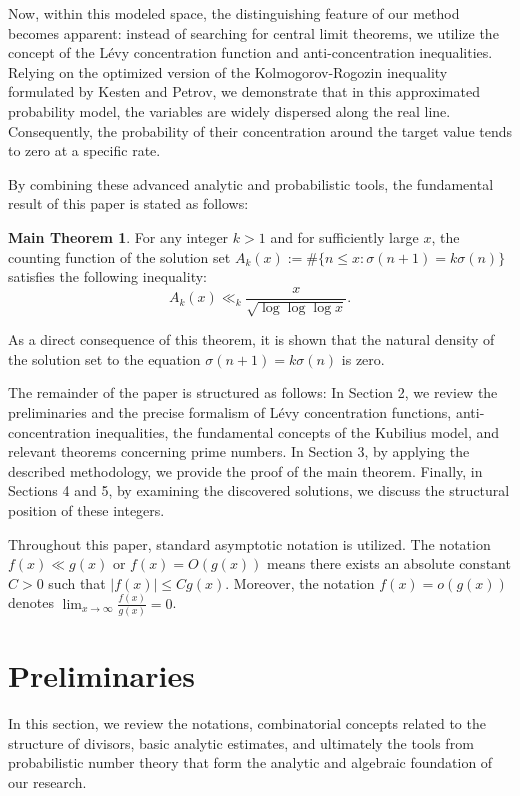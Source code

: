 \documentclass[12pt, a4paper]{article}
\theoremstyle{plain}
\theoremstyle{definition}
\newtheorem*{maintheorem}{Main Theorem}
\begin{document}
Now, within this modeled space, the distinguishing feature of our method becomes apparent: instead of searching for central limit theorems, we utilize the concept of the Lévy concentration function and anti-concentration inequalities. Relying on the optimized version of the Kolmogorov-Rogozin inequality formulated by Kesten and Petrov, we demonstrate that in this approximated probability model, the variables are widely dispersed along the real line. Consequently, the probability of their concentration around the target value tends to zero at a specific rate.

By combining these advanced analytic and probabilistic tools, the fundamental result of this paper is stated as follows:

\begin{maintheorem}
For any integer $k > 1$ and for sufficiently large $x$, the counting function of the solution set $A_k(x) := \text{\#}\{n \leq x : \sigma(n + 1) = k\sigma(n)\}$ satisfies the following inequality:
\[ A_k(x) \ll_k \frac{x}{\sqrt{\log \log \log x}}. \]
\end{maintheorem}

As a direct consequence of this theorem, it is shown that the natural density of the solution set to the equation $\sigma(n + 1) = k\sigma(n)$ is zero.

The remainder of the paper is structured as follows: In Section 2, we review the preliminaries and the precise formalism of Lévy concentration functions, anti-concentration inequalities, the fundamental concepts of the Kubilius model, and relevant theorems concerning prime numbers. In Section 3, by applying the described methodology, we provide the proof of the main theorem. Finally, in Sections 4 and 5, by examining the discovered solutions, we discuss the structural position of these integers.

Throughout this paper, standard asymptotic notation is utilized. The notation $f(x) \ll g(x)$ or $f(x) = O(g(x))$ means there exists an absolute constant $C > 0$ such that $|f(x)| \leq Cg(x)$. Moreover, the notation $f(x) = o(g(x))$ denotes $\lim_{x \to \infty} \frac{f(x)}{g(x)} = 0$.

\section{Preliminaries}
In this section, we review the notations, combinatorial concepts related to the structure of divisors, basic analytic estimates, and ultimately the tools from probabilistic number theory that form the analytic and algebraic foundation of our research.
\end{document}
